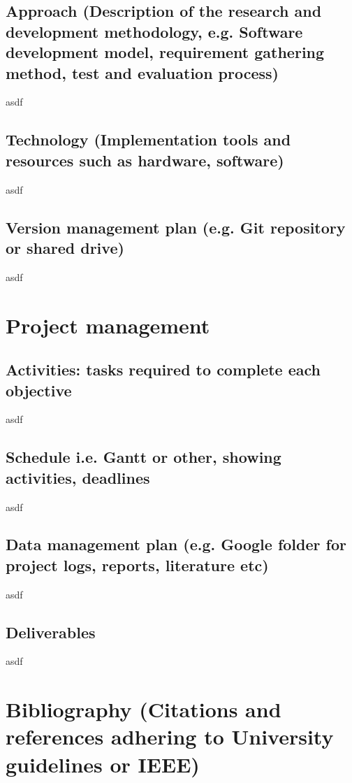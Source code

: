 \documentclass[12pt]{article}
\begin{document}
\subsection{Approach (Description of the research and development methodology, e.g. Software
development model, requirement gathering method, test and evaluation process)}
asdf
\subsection{Technology (Implementation tools and resources such as hardware, software)}
asdf
\subsection{Version management plan (e.g. Git repository or shared drive)}
asdf

\section{Project management}
\subsection{Activities: tasks required to complete each objective}
asdf
\subsection{Schedule i.e. Gantt or other, showing activities, deadlines}
asdf
\subsection{Data management plan (e.g. Google folder for project logs, reports, literature etc)}
asdf
\subsection{Deliverables}
asdf


\section{Bibliography (Citations and references adhering to University guidelines or IEEE)}



\end{document}

